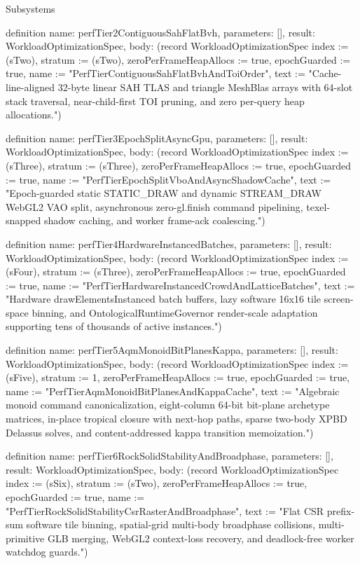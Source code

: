 \begin{lexlean}{Subsystems}
\begin{semanticmodule}
definition{
  name: perfTier2ContiguousSahFlatBvh,
  parameters: [],
  result: WorkloadOptimizationSpec,
  body: (record WorkloadOptimizationSpec {index := (sTwo), stratum := (sTwo), zeroPerFrameHeapAllocs := true, epochGuarded := true, name := "PerfTierContiguousSahFlatBvhAndToiOrder", text := "Cache-line-aligned 32-byte linear SAH TLAS and triangle MeshBlas arrays with 64-slot stack traversal, near-child-first TOI pruning, and zero per-query heap allocations."})
}

definition{
  name: perfTier3EpochSplitAsyncGpu,
  parameters: [],
  result: WorkloadOptimizationSpec,
  body: (record WorkloadOptimizationSpec {index := (sThree), stratum := (sThree), zeroPerFrameHeapAllocs := true, epochGuarded := true, name := "PerfTierEpochSplitVboAndAsyncShadowCache", text := "Epoch-guarded static STATIC_DRAW and dynamic STREAM_DRAW WebGL2 VAO split, asynchronous zero-gl.finish command pipelining, texel-snapped shadow caching, and worker frame-ack coalescing."})
}

definition{
  name: perfTier4HardwareInstancedBatches,
  parameters: [],
  result: WorkloadOptimizationSpec,
  body: (record WorkloadOptimizationSpec {index := (sFour), stratum := (sThree), zeroPerFrameHeapAllocs := true, epochGuarded := true, name := "PerfTierHardwareInstancedCrowdAndLatticeBatches", text := "Hardware drawElementsInstanced batch buffers, lazy software 16x16 tile screen-space binning, and OntologicalRuntimeGovernor render-scale adaptation supporting tens of thousands of active instances."})
}

definition{
  name: perfTier5AqmMonoidBitPlanesKappa,
  parameters: [],
  result: WorkloadOptimizationSpec,
  body: (record WorkloadOptimizationSpec {index := (sFive), stratum := 1, zeroPerFrameHeapAllocs := true, epochGuarded := true, name := "PerfTierAqmMonoidBitPlanesAndKappaCache", text := "Algebraic monoid command canonicalization, eight-column 64-bit bit-plane archetype matrices, in-place tropical closure with next-hop paths, sparse two-body XPBD Delassus solves, and content-addressed kappa transition memoization."})
}

definition{
  name: perfTier6RockSolidStabilityAndBroadphase,
  parameters: [],
  result: WorkloadOptimizationSpec,
  body: (record WorkloadOptimizationSpec {index := (sSix), stratum := (sTwo), zeroPerFrameHeapAllocs := true, epochGuarded := true, name := "PerfTierRockSolidStabilityCsrRasterAndBroadphase", text := "Flat CSR prefix-sum software tile binning, spatial-grid multi-body broadphase collisions, multi-primitive GLB merging, WebGL2 context-loss recovery, and deadlock-free worker watchdog guards."})
}


\end{semanticmodule}
\end{lexlean}
